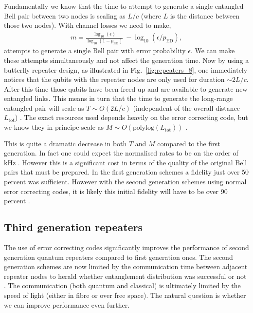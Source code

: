 \documentclass[twocolumn, aps, rmp, amsmath, amssymb, nofootinbib, superscriptaddress, longbibliography, floatfix, table-of-contents, eqsecnum]{revtex4-1}
\newcommand{\comment}[1]{{\color{blue}{\textbf{#1}}}}
\begin{document}
Fundamentally we know that the time to attempt to generate a single entangled Bell pair between two nodes is scaling as $L/c$ (where $L$ is the distance between those two nodes). With channel losses we need to make,
\begin{align}
m=\frac{\log_{10} (\epsilon)}{\log_{10} (1-p_\mathrm{ED})} ~ - \log_{10} (\epsilon / p_\mathrm{ED}),
\end{align}
attempts to generate a single Bell pair with error probability $\epsilon$. We can make these attempts simultaneously and not affect the generation time. Now by using a butterfly repeater design, as illustrated in Fig.~\ref{fig:repeaters_8}, one immediately notices that the qubits with the repeater nodes are only used for duration $\sim 2 L/c$. After this time those qubits have been freed up and are available to generate new entangled links. This means in turn that the time to generate the long-range entangled pair will scale as \mbox{$T\sim O(2L/c)$} (independent of the overall distance $L_\mathrm{tot}$) \cite{bib:jiang09, bib:munro10, bib:Muralidharan2016}. The exact resources used depends heavily on the error correcting code, but we know they in principe scale as \mbox{$M \sim O(\mathrm{polylog}(L_\mathrm{tot}))$} \cite{bib:Muralidharan2016}.

This is quite a dramatic decrease in both $T$ and $M$ compared to the first generation. In fact one could expect the normalised rates to be on the order of kHz \cite{bib:munro10}. However this is a significant cost in terms of the quality of the original Bell pairs that must be prepared. In the first generation schemes a fidelity just over 50 percent was sufficient. However with the second generation schemes using normal error correcting codes, it is likely this initial fidelity will have to be over 90 percent \cite{bib:jiang09, bib:munro10}. 

\comment{Up to here}

\subsection{Third generation repeaters}

The use of error correcting codes significantly improves the performance of second generation quantum repeaters compared to first generation ones. The second generation schemes are now limited by the communication time between adjacent repeater nodes to herald whether entanglement distribution was successful or not \cite{bib:munro10, bib:munro12}. The communication (both quantum and classical) is ultimately limited by the speed of light (either in fibre or over free space). The natural question is whether we can improve performance even further.
\end{document}
